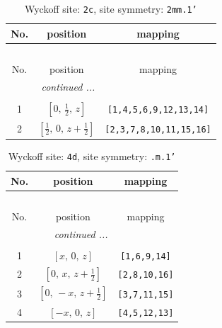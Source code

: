 \documentclass[fleqn,8pt]{jsarticle}
\begin{document}
\renewcommand{\arraystretch}{1.2}
\begin{longtable}{ccc}
\caption{Wyckoff site: {\tt 2c}, site symmetry: {\tt 2mm.1'}}
 \\
 \hline \hline
No. & position & mapping \\ \hline \endfirsthead

\multicolumn{2}{l}{\tablename\ \thetable{}} \\
 \hline \hline
No. & position & mapping \\ \hline \endhead

 \hline \hline
\multicolumn{2}{r}{\footnotesize\it continued ...} \\ \endfoot

 \hline \hline
\multicolumn{2}{r}{} \\ \endlastfoot

1 & $\left[ 0,\, \frac{1}{2},\, z \right]$ & {\tt [1,4,5,6,9,12,13,14]} \\ \hline
2 & $\left[ \frac{1}{2},\, 0,\, z + \frac{1}{2} \right]$ & {\tt [2,3,7,8,10,11,15,16]} \\
\end{longtable}
\renewcommand{\arraystretch}{1.2}
\begin{longtable}{ccc}
\caption{Wyckoff site: {\tt 4d}, site symmetry: {\tt .m.1'}}
 \\
 \hline \hline
No. & position & mapping \\ \hline \endfirsthead

\multicolumn{2}{l}{\tablename\ \thetable{}} \\
 \hline \hline
No. & position & mapping \\ \hline \endhead

 \hline \hline
\multicolumn{2}{r}{\footnotesize\it continued ...} \\ \endfoot

 \hline \hline
\multicolumn{2}{r}{} \\ \endlastfoot

1 & $\left[ x,\, 0,\, z \right]$ & {\tt [1,6,9,14]} \\ \hline
2 & $\left[ 0,\, x,\, z + \frac{1}{2} \right]$ & {\tt [2,8,10,16]} \\ \hline
3 & $\left[ 0,\, - x,\, z + \frac{1}{2} \right]$ & {\tt [3,7,11,15]} \\ \hline
4 & $\left[ - x,\, 0,\, z \right]$ & {\tt [4,5,12,13]} \\
\end{longtable}
\renewcommand{\arraystretch}{1.2}
\end{document}
